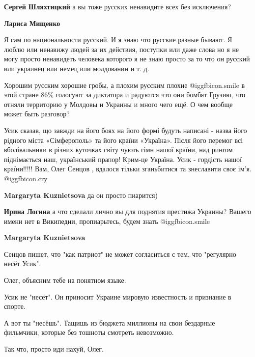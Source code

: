 \begin{itemize}
\begin{itemize} %
\textbf{Сергей Шляхтицкий} а вы тоже русских ненавидите всех без исключения?

\textbf{Лариса Мищенко} 

Я сам по национальности русский. И я знаю что русские разные бывают. Я люблю или
ненавижу людей за их действия, поступки или даже слова но я не могу просто
ненавидеть человека которого я не знаю просто за то что он русский или украинец
или немец или молдованин и т. д.


Хорошим русским хорошие гробы, а плохим русским плохие  @igg{fbicon.smile}  в этой стране 86\%
голосуют за диктатора и радуются что они бомбят Грузию, что отняли территорию у
Молдовы и Украины и много чего ещё. О чем вообще может быть разговор?

\end{itemize} %


Усик сказав, що завжди на його боях на його формі будуть написані - назва його
рідного міста «Сімферополь» та його країни «Україна». Після його перемог всі
вболівальники в різних куточках світу чують гімн нашої країни, над рингом
піднімається наш, український прапор! Крим-це Україна. Усик - гордість нашої
країни!!!!! Вам, Олег Сенцов , вдалося тільки зганьбитися та знеславити своє
ім’я.  @igg{fbicon.cry} 

\begin{itemize} %
\textbf{Margaryta Kuznietsova} да он просто пиарится)

\textbf{Ирина Логина} а что сделали лично вы для поднятия престижа Украины? Вашего имени нет в Википедии, пропиарьтесь, будем знать  @igg{fbicon.smile} 

\textbf{Margaryta Kuznietsova} 

Сенцов пишет, что "как патриот" не может согласиться с тем, что "регулярно
несёт Усик".

Олег, объясним тебе на понятном языке.

Усик не "несёт". Он приносит Украине мировую известность и признание в спорте.

А вот ты "несёшь". Тащишь из бюджета миллионы на свои бездарные фильмчики,
которые без тошноты смотреть невозможно.

Так что, просто иди нахуй, Олег.


\end{itemize}
\end{itemize}
